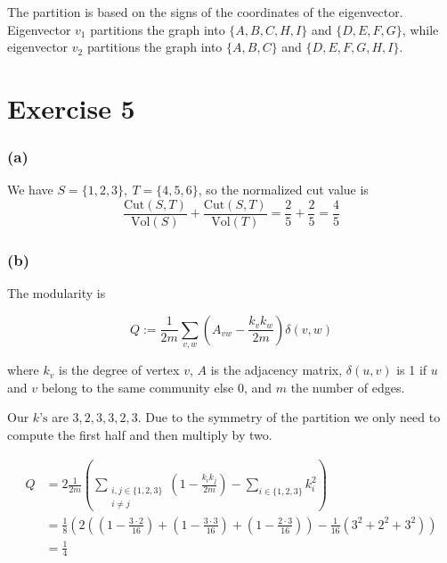 \documentclass{article}
\begin{document}
The partition is based on the signs of the coordinates of the eigenvector.
Eigenvector \(v_1\) partitions the graph into
\(\{A, B, C, H, I\}\) and \(\{D, E, F, G\}\),
while eigenvector \(v_2\) partitions the graph into
\(\{A, B, C\}\) and \(\{D, E, F, G, H, I\}\).


\section*{Exercise 5}

\subsubsection*{(a)}

We have \(S = \{1,2,3\},\ T = \{4,5,6\}\), so the normalized cut value is
\begin{equation*}
    \frac{\textrm{Cut}(S, T)}{\textrm{Vol}(S)}
        +\frac{\textrm{Cut}(S, T)}{\textrm{Vol}(T)}
    = \frac{2}{5} + \frac{2}{5}
    = \frac{4}{5}
\end{equation*}

\subsubsection*{(b)}

The modularity is

\begin{equation*}
    Q := \frac{1}{2m} 
        \sum_{v, w} \left( A_{vw} - \frac{k_v k_w}{2m} \right)
        \delta(v, w)
\end{equation*}

where \(k_v\) is the degree of vertex \(v\),
\(A\) is the adjacency matrix,
\(\delta(u, v)\) is 1 if \(u\) and \(v\) belong to the same community else 0,
and \(m\) the number of edges.

Our \(k\textrm{'s}\) are \(3, 2, 3, 3, 2, 3\).
Due to the symmetry of the partition we only need to compute the first half
and then multiply by two.

\begin{align*}
    Q &= 2 \frac{1}{2m}
        \left(
            \sum_{\substack{i,j \in \{1,2,3\} \\ i\neq j}}
                \left( 1 - \frac{k_i k_j}{2m} \right)
            -\sum_{i \in \{1,2,3\}}k_i^2
        \right)\\
      &= \frac{1}{8}
        \left(
            2 \left(
                (1 - \frac{3 \cdot 2}{16})
                + (1 - \frac{3 \cdot 3}{16})
                + (1 - \frac{2 \cdot 3}{16})
            \right)
            - \frac{1}{16}\left(
                3^2 + 2^2 + 3^2
            \right)
        \right)\\
      &= \frac{1}{4}
\end{align*}
\end{document}
